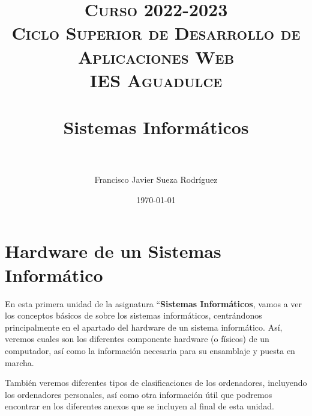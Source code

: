 


\title{
\normalfont \normalsize
\textsc{{\bfseries Curso 2022-2023} \\ Ciclo Superior de Desarrollo de Aplicaciones Web \\ IES Aguadulce} \\ [25pt]
\horrule{0.5pt} \\[0.4cm]
\huge Sistemas Informáticos \\
\horrule{0.5pt} \\[0.4cm]
}

\author{Francisco Javier Sueza Rodríguez}
\date{\normalsize\today}

\makeglossaries
{}



\maketitle

\newpage

\tableofcontents

\listoffigures


\newpage

\chapter{Hardware de un Sistemas Informático}
En esta primera unidad de la asignatura ``\textbf{Sistemas Informáticos}, vamos a ver los conceptos básicos de sobre los sistemas informáticos, centrándonos principalmente en el apartado del hardware de un sistema informático. Así, veremos cuales son los diferentes componente hardware (o físicos) de un computador, así como la información necesaria para su ensamblaje y puesta en marcha.

También veremos diferentes tipos de clasificaciones de los ordenadores, incluyendo los ordenadores personales, así como otra información útil que podremos encontrar en los diferentes anexos que se incluyen al final de esta unidad.

